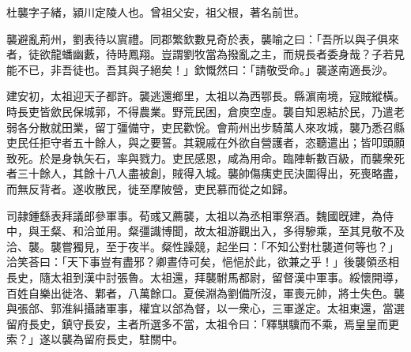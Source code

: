 \begin{pinyinscope}
 
 
 杜襲字子緒，潁川定陵人也。曾祖父安，祖父根，著名前世。
 
 
 襲避亂荊州，劉表待以賔禮。同郡繁欽數見奇於表，襲喻之曰：「吾所以與子俱來者，徒欲龍蟠幽藪，待時鳳翔。豈謂劉牧當為撥亂之主，而規長者委身哉？子若見能不已，非吾徒也。吾其與子絕矣！」欽慨然曰：「請敬受命。」襲遂南適長沙。
 
 
建安初，太祖迎天子都許。襲逃還鄉里，太祖以為西鄂長。縣濵南境，寇賊縱橫。時長吏皆歛民保城郭，不得農業。野荒民困，倉庾空虛。襲自知恩結於民，乃遣老弱各分散就田業，留丁彊備守，吏民歡恱。會荊州出步騎萬人來攻城，襲乃悉召縣吏民任拒守者五十餘人，與之要誓。其親戚在外欲自營護者，恣聽遣出；皆叩頭願致死。於是身執矢石，率與戮力。吏民感恩，咸為用命。臨陣斬數百級，而襲衆死者三十餘人，其餘十八人盡被創，賊得入城。襲帥傷痍吏民決圍得出，死喪略盡，而無反背者。遂收散民，徙至摩陂營，吏民慕而從之如歸。
 
 
 
 
 司隷鍾繇表拜議郎參軍事。荀彧又薦襲，太祖以為丞相軍祭酒。魏國旣建，為侍中，與王粲、和洽並用。粲彊識博聞，故太祖游觀出入，多得驂乘，至其見敬不及洽、襲。襲嘗獨見，至于夜半。粲性躁競，起坐曰：「不知公對杜襲道何等也？」洽笑荅曰：「天下事豈有盡邪？卿晝侍可矣，悒悒於此，欲兼之乎！」後襲領丞相長史，隨太祖到漢中討張魯。太祖還，拜襲駙馬都尉，留督漢中軍事。綏懷開導，百姓自樂出徙洛、鄴者，八萬餘口。夏侯淵為劉備所沒，軍喪元帥，將士失色。襲與張郃、郭淮糾攝諸軍事，權宜以郃為督，以一衆心，三軍遂定。太祖東還，當選留府長史，鎮守長安，主者所選多不當，太祖令曰：「釋騏驥而不乘，焉皇皇而更索？」遂以襲為留府長史，駐關中。
 

\end{pinyinscope}
